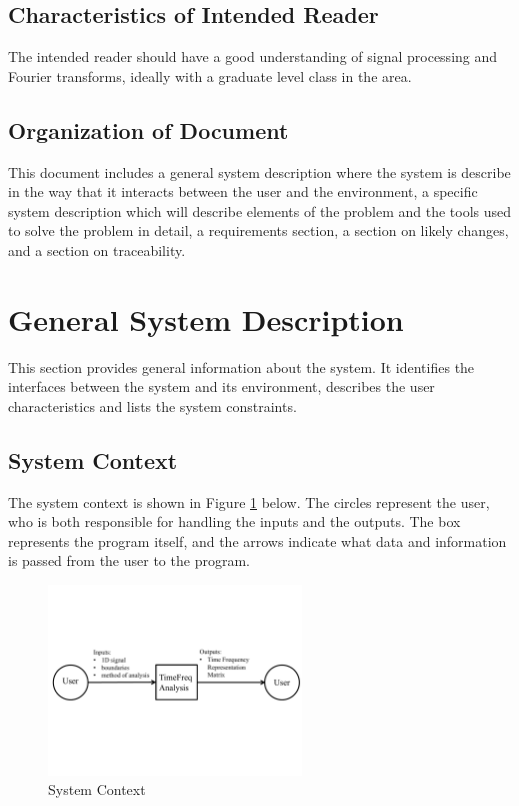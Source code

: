 \documentclass[12pt]{article}
\begin{document}
\subsection{Characteristics of Intended Reader} \label{sec_IntendedReader}

The intended reader should have a good understanding of signal processing and Fourier transforms, ideally with a graduate level class in the area.

\subsection{Organization of Document}

This document includes a general system description where the system is describe in the way that it interacts between the user and the environment, a specific system description which will describe elements of the problem and the tools used to solve the problem in detail, a requirements section, a section on likely changes, and a section on traceability. 

\section{General System Description}

This section provides general information about the system.  It identifies the
interfaces between the system and its environment, describes the user
characteristics and lists the system constraints.\\ 

\subsection{System Context}

The system context is shown in Figure \ref{Fig_SystemContext} below. The circles represent the user, who is both responsible for handling the inputs and the outputs. The box represents the program itself, and the arrows indicate what data and information is passed from the user to the program. 
\begin{figure}[h!]
\begin{center}
 \includegraphics[width=0.6\textwidth]{SystemContextFigure}
\caption{System Context}
\label{Fig_SystemContext} 
\end{center}
\end{figure}
\end{document}
